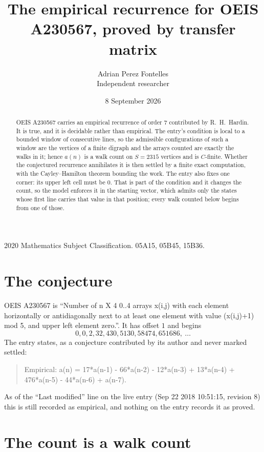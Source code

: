 \documentclass[11pt,a4paper]{article}
\title{The empirical recurrence for OEIS A230567, proved by transfer matrix}
\author{Adrian Perez Fontelles\\ \small Independent researcher}
\date{8 September 2026}
\theoremstyle{plain}
\theoremstyle{definition}
\begin{document}
\maketitle

\begin{abstract}
OEIS A230567 carries an empirical recurrence of order $7$ contributed by R.~H.~Hardin. It is
true, and it is decidable rather than empirical. The entry's condition is local to a bounded window of consecutive lines, so
the admissible configurations of such a window are the vertices of a finite digraph and the
arrays counted are exactly the walks in it; hence $a(n)$ is a walk count on $S=2315$ vertices
and is $C$-finite. Whether the conjectured recurrence annihilates it is then settled by a
finite exact computation, with the Cayley--Hamilton theorem bounding the work.
 The entry also fixes one corner: its upper left cell must be $0$. That is part of the condition and it changes the count, so the model enforces it in the starting vector, which admits only the states whose first line carries that value in that position; every walk counted below begins from one of those.\end{abstract}

\noindent\small 2020 Mathematics Subject Classification. 05A15, 05B45, 15B36.\normalsize

\section{The conjecture}

OEIS A230567 is ``Number of n X 4 0..4 arrays x(i,j) with each element horizontally or antidiagonally next to at least one element with value (x(i,j)+1) mod 5, and upper left element zero.''. It has offset $1$ and begins
\[
0, 0, 2, 32, 430, 5130, 58474, 651686,\ \dots
\]
The entry states, as a conjecture contributed by its author and never marked settled:
\begin{quote}
Empirical: a(n) = 17*a(n-1) - 66*a(n-2) - 12*a(n-3) + 13*a(n-4) + 476*a(n-5) - 44*a(n-6) + a(n-7).
\end{quote}
As of the ``Last modified'' line on the live entry (Sep 22 2018 10:51:15, revision 8) this is still
recorded as empirical, and nothing on the entry records it as proved.

\section{The count is a walk count}
\end{document}
